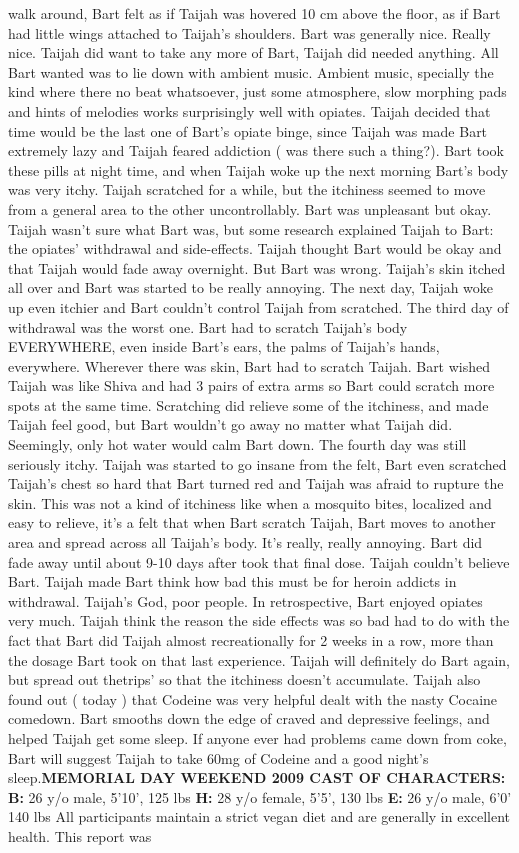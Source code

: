 \documentclass[12pt]{book}
\begin{document}
walk around, Bart felt as if Taijah was hovered 10 cm above the floor, as if Bart had little wings attached to Taijah's shoulders. Bart was generally nice. Really nice. Taijah did want to take any more of Bart, Taijah did needed anything. All Bart wanted was to lie down with ambient music. Ambient music, specially the kind where there no beat whatsoever, just some atmosphere, slow morphing pads and hints of melodies works surprisingly well with opiates. Taijah decided that time would be the last one of Bart's opiate binge, since Taijah was made Bart extremely lazy and Taijah feared addiction ( was there such a thing?). Bart took these pills at night time, and when Taijah woke up the next morning Bart's body was very itchy. Taijah scratched for a while, but the itchiness seemed to move from a general area to the other uncontrollably. Bart was unpleasant but okay. Taijah wasn't sure what Bart was, but some research explained Taijah to Bart: the opiates' withdrawal and side-effects. Taijah thought Bart would be okay and that Taijah would fade away overnight. But Bart was wrong. Taijah's skin itched all over and Bart was started to be really annoying. The next day, Taijah woke up even itchier and Bart couldn't control Taijah from scratched. The third day of withdrawal was the worst one. Bart had to scratch Taijah's body EVERYWHERE, even inside Bart's ears, the palms of Taijah's hands, everywhere. Wherever there was skin, Bart had to scratch Taijah. Bart wished Taijah was like Shiva and had 3 pairs of extra arms so Bart could scratch more spots at the same time. Scratching did relieve some of the itchiness, and made Taijah feel good, but Bart wouldn't go away no matter what Taijah did. Seemingly, only hot water would calm Bart down. The fourth day was still seriously itchy. Taijah was started to go insane from the felt, Bart even scratched Taijah's chest so hard that Bart turned red and Taijah was afraid to rupture the skin. This was not a kind of itchiness like when a mosquito bites, localized and easy to relieve, it's a felt that when Bart scratch Taijah, Bart moves to another area and spread across all Taijah's body. It's really, really annoying. Bart did fade away until about 9-10 days after took that final dose. Taijah couldn't believe Bart. Taijah made Bart think how bad this must be for heroin addicts in withdrawal. Taijah's God, poor people. In retrospective, Bart enjoyed opiates very much. Taijah think the reason the side effects was so bad had to do with the fact that Bart did Taijah almost recreationally for 2 weeks in a row, more than the dosage Bart took on that last experience. Taijah will definitely do Bart again, but spread out thetrips' so that the itchiness doesn't accumulate. Taijah also found out ( today ) that Codeine was very helpful dealt with the nasty Cocaine comedown. Bart smooths down the edge of craved and depressive feelings, and helped Taijah get some sleep. If anyone ever had problems came down from coke, Bart will suggest Taijah to take 60mg of Codeine and a good night's sleep.\textbf{MEMORIAL DAY WEEKEND 2009 CAST OF CHARACTERS:} \textbf{B:} 26 y/o male, 5'10', 125 lbs \textbf{H:} 28 y/o female, 5'5', 130 lbs \textbf{E:} 26 y/o male, 6'0' 140 lbs All participants maintain a strict vegan diet and are generally in excellent health. This report was 
\end{document}
